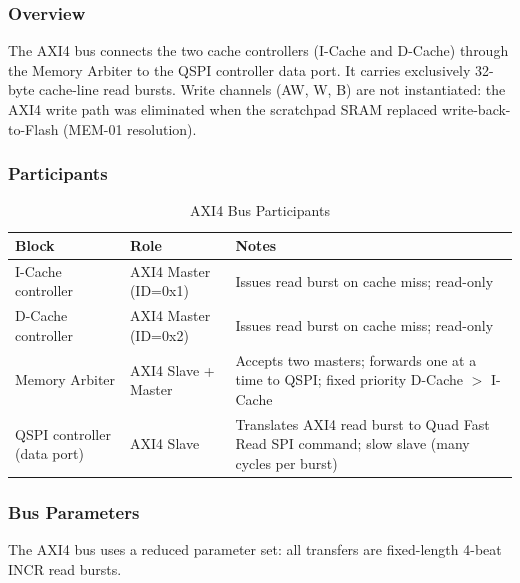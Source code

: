 \subsubsection{Overview}

The AXI4 bus connects the two cache controllers (I-Cache and D-Cache)
through the Memory Arbiter to the QSPI controller data port.
It carries exclusively 32-byte cache-line read bursts.
Write channels (AW, W, B) are not instantiated: the AXI4 write path was
eliminated when the scratchpad SRAM replaced write-back-to-Flash
(MEM-01 resolution).

\subsubsection{Participants}

\begin{table}[H]
\caption{AXI4 Bus Participants}
\label{tab:asAxi4Participants}
\centering
\begin{tabularx}{\textwidth}{|l |l |X|}
  \hline
  Block & Role & Notes \\
  \hline
  \hline
  I-Cache controller & AXI4 Master (ID=0x1) &
    Issues read burst on cache miss; read-only \\
  \hline
  D-Cache controller & AXI4 Master (ID=0x2) &
    Issues read burst on cache miss; read-only \\
  \hline
  Memory Arbiter     & AXI4 Slave + Master &
    Accepts two masters; forwards one at a time to QSPI;
    fixed priority D-Cache $>$ I-Cache \\
  \hline
  QSPI controller (data port) & AXI4 Slave &
    Translates AXI4 read burst to Quad Fast Read SPI command;
    slow slave (many cycles per burst) \\
  \hline
\end{tabularx}
\end{table}

\subsubsection{Bus Parameters}

The AXI4 bus uses a reduced parameter set:
all transfers are fixed-length 4-beat INCR read bursts.

